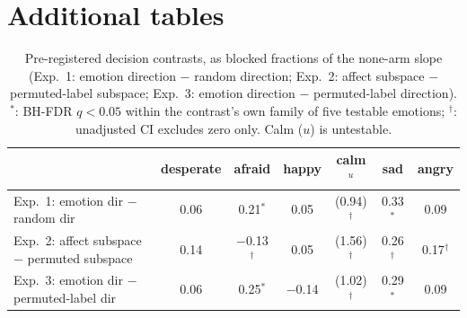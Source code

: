\documentclass{article}
\newcommand{\q}{^{*}}          %
\newcommand{\ua}{^{\dagger}}   %
\begin{document}
\section{Additional tables}
\label{app:tables}

\begin{table}[H]\centering\footnotesize
\caption{Pre-registered decision contrasts, as blocked fractions of the none-arm slope (Exp.~1: emotion direction $-$ random direction; Exp.~2: affect subspace $-$ permuted-label subspace; Exp.~3: emotion direction $-$ permuted-label direction). $\q$: BH-FDR $q<0.05$ within the contrast's own family of five testable emotions; $\ua$: unadjusted CI excludes zero only. Calm ($u$) is untestable.}
\label{tab:decision}
\begin{tabular}{lcccccc}\toprule
 & desperate & afraid & happy & calm$^{u}$ & sad & angry \\ \midrule
Exp.~1: emotion dir $-$ random dir & 0.06 & 0.21$\q$ & 0.05 & (0.94)$\ua$ & 0.33$\q$ & 0.09 \\
Exp.~2: affect subspace $-$ permuted subspace & 0.14 & $-$0.13$\ua$ & 0.05 & (1.56)$\ua$ & 0.26$\ua$ & 0.17$\ua$ \\
Exp.~3: emotion dir $-$ permuted-label dir & 0.06 & 0.25$\q$ & $-$0.14 & (1.02)$\ua$ & 0.29$\q$ & 0.09 \\ \bottomrule
\end{tabular}
\end{table}

\begin{table}[H]\centering\footnotesize
\caption{Every ablation arm against baseline (none), as blocked fractions of the none-arm slope, scenario-blocked and dose-paired; marks as in Table~\ref{tab:decision}, families being the arm's five testable emotions.}
\label{tab:arms}
\resizebox{\textwidth}{!}{}
\end{table}
\end{document}
